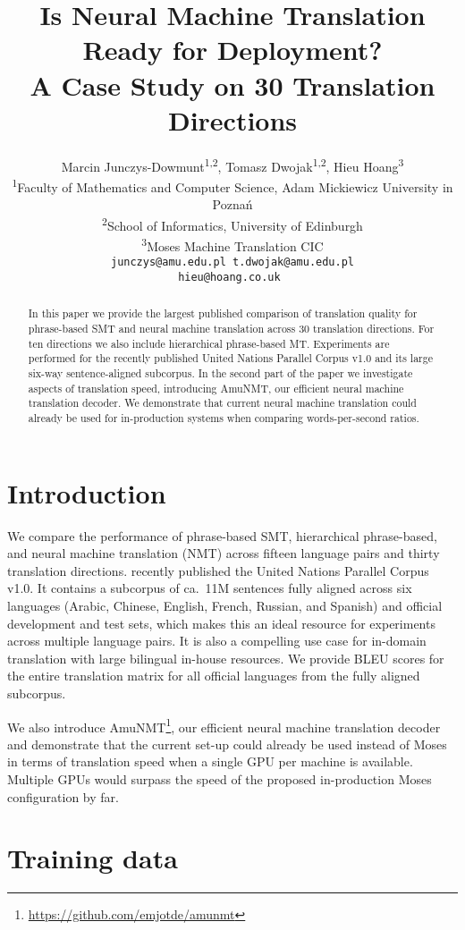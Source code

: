 \documentclass[11pt]{article}
\title{Is Neural Machine Translation Ready for Deployment? \\ A Case Study on 30 Translation Directions}
\author{Marcin Junczys-Dowmunt\textsuperscript{1,2}, Tomasz Dwojak\textsuperscript{1,2}, Hieu Hoang\textsuperscript{3} \\
\textsuperscript{1}Faculty of Mathematics and Computer Science, Adam Mickiewicz University in Pozna\'{n}\\
\textsuperscript{2}School of Informatics, University of Edinburgh \\
\textsuperscript{3}Moses Machine Translation CIC\\
{\tt \normalsize junczys@amu.edu\pgfplotsset{try min ticks=3}.pl t.dwojak@amu.edu.pl}\\
{\tt \normalsize hieu@hoang.co.uk }}
\date{}
\begin{document}
 \maketitle
\begin{abstract}
In this paper we provide the largest published comparison of translation quality for phrase-based SMT and neural machine translation across 30 translation directions. For ten directions we also include hierarchical phrase-based MT. Experiments are performed for the recently published United Nations Parallel Corpus v1.0 and its large six-way sentence-aligned subcorpus. 
In the second part of the paper we investigate aspects of translation speed, introducing AmuNMT, our efficient neural machine translation decoder. We demonstrate that current neural machine translation could already be used for in-production systems when comparing words-per-second ratios.

\end{abstract}

\section{Introduction}

We compare the performance of phrase-based SMT, hierarchical phrase-based, and neural machine translation (NMT) across fifteen language pairs and thirty translation directions. \cite{ZIEMSKI16.1195} recently published the United Nations Parallel Corpus v1.0. It contains a subcorpus of ca.~11M sentences fully aligned across six languages (Arabic, Chinese, English, French, Russian, and Spanish) and official development and test sets, which makes this an ideal resource for experiments across multiple language pairs. It is also a compelling use case for in-domain translation with large bilingual in-house resources. We provide BLEU scores for the entire translation matrix for all official languages from the fully aligned subcorpus. 

We also introduce AmuNMT\footnote{\url{https://github.com/emjotde/amunmt}}, our efficient neural machine translation decoder and demonstrate that the current set-up could already be used instead of Moses in terms of translation speed when a single GPU per machine is available. Multiple GPUs would surpass the speed of the proposed in-production Moses configuration by far. 

\section{Training data}
\end{document}
